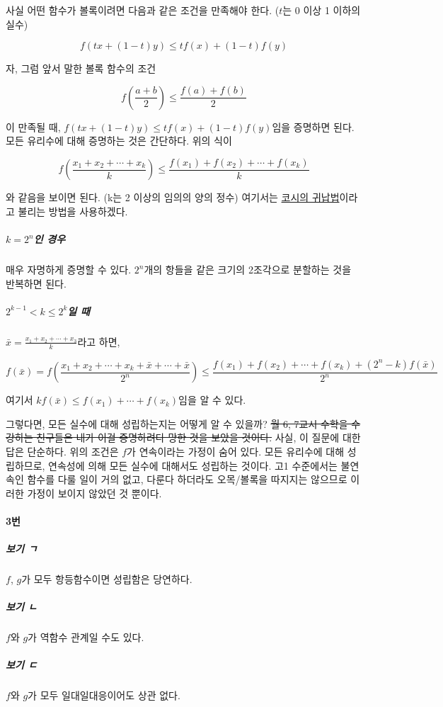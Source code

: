 \documentclass{article}
\begin{document}
사실 어떤 함수가 볼록이려면 다음과 같은 조건을 만족해야 한다. ($t$는 0 이상 1 이하의 실수)

\[
    f(tx + (1 - t)y) \le tf(x) + (1 - t)f(y)
\]

자, 그럼 앞서 말한 볼록 함수의 조건

\[
    f(\frac{a + b}{2}) \le \frac{f(a) + f(b)}{2}
\]

이 만족될 때, $f(tx + (1 - t)y) \le tf(x) + (1 - t)f(y)$임을 증명하면 된다. 모든 유리수에 대해 증명하는 것은 간단하다. 위의 식이

\[
    f(\frac{x_1 + x_2 + \cdots + x_k}{k}) \le \frac{f(x_1) + f(x_2) + \cdots + f(x_k)}{k}
\]

와 같음을 보이면 된다. (k는 2 이상의 임의의 양의 정수) 여기서는 \href{https://en.wikipedia.org/wiki/Inequality\_of\_arithmetic\_and\_geometric\_means\#Proof\_by\_Cauchy\_using\_forward\%E2\%80\%93backward\_induction}{코시의 귀납법}이라고 불리는 방법을 사용하겠다.

\subparagraph{$k = 2^n$인 경우} 매우 자명하게 증명할 수 있다. $2^n$개의 항들을 같은 크기의 2조각으로 분할하는 것을 반복하면 된다.

\subparagraph{$2^{k - 1} < k \le 2^k$일 때} $\bar{x} = \frac{x_1 + x_2 + \cdots + x_3}{k}$라고 하면,

\[
    f(\bar{x}) = f(\frac{x_1 + x_2 + \cdots + x_k + \bar{x} + \cdots + \bar{x}}{2^n}) \le \frac{f(x_1) + f(x_2) + \cdots + f(x_k) + (2^n - k)f(\bar{x})}{2^n}
\]

여기서 $kf(\bar{x}) \le f(x_1) + \cdots + f(x_k)$임을 알 수 있다. \newline

그렇다면, 모든 실수에 대해 성립하는지는 어떻게 알 수 있을까? \sout{월 6, 7교시 수학을 수강하는 친구들은 내가 이걸 증명하려다 망한 것을 보았을 것이다.} 사실, 이 질문에 대한 답은 단순하다. 위의 조건은 $f$가 연속이라는 가정이 숨어 있다. 모든 유리수에 대해 성립하므로, 연속성에 의해 모든 실수에 대해서도 성립하는 것이다. 고1 수준에서는 불연속인 함수를 다룰 일이 거의 없고, 다룬다 하더라도 오목/볼록을 따지지는 않으므로 이러한 가정이 보이지 않았던 것 뿐이다.

\paragraph{3번}

\subparagraph{보기 ㄱ} $f$, $g$가 모두 항등함수이면 성립함은 당연하다.
\subparagraph{보기 ㄴ} $f$와 $g$가 역함수 관계일 수도 있다.
\subparagraph{보기 ㄷ} $f$와 $g$가 모두 일대일대응이어도 상관 없다. \newline
\end{document}

